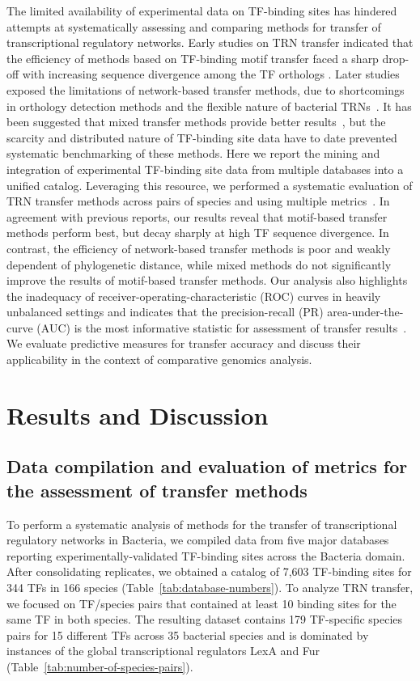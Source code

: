 The limited availability of experimental data on TF-binding sites has hindered
attempts at systematically assessing and comparing methods for transfer of
transcriptional regulatory networks. Early studies on TRN transfer indicated
that the efficiency of methods based on TF-binding motif transfer faced a sharp
drop-off with increasing sequence divergence among the TF orthologs
\citep{yu2004annotation}. Later studies exposed the limitations of
network-based transfer methods, due to shortcomings in orthology detection
methods and the flexible nature of bacterial TRNs~\citep{babu2006evolutionary,
  chavez2006bacterial, price2007orthologous}. It has been suggested that mixed
transfer methods provide better results~\citep{baumbach2010power}, but the
scarcity and distributed nature of TF-binding site data have to date prevented
systematic benchmarking of these methods. Here we report the mining and
integration of experimental TF-binding site data from multiple databases into a
unified catalog. Leveraging this resource, we performed a systematic evaluation
of TRN transfer methods across pairs of species and using multiple
metrics~\citep{kilic2015assessment}. In agreement with previous reports, our
results reveal that motif-based transfer methods perform best, but decay
sharply at high TF sequence divergence. In contrast, the efficiency of
network-based transfer methods is poor and weakly dependent of phylogenetic
distance, while mixed methods do not significantly improve the results of
motif-based transfer methods. Our analysis also highlights the inadequacy of
receiver-operating-characteristic (ROC) curves in heavily unbalanced settings
and indicates that the precision-recall (PR) area-under-the-curve (AUC) is the
most informative statistic for assessment of transfer
results~\citep{lewis1991evaluating, zweig1993receiver}. We evaluate
predictive measures for transfer accuracy and discuss their applicability in
the context of comparative genomics analysis.


\section{Results and Discussion}

\subsection{Data compilation and evaluation of metrics for the assessment of
  transfer methods}

To perform a systematic analysis of methods for the transfer of transcriptional
regulatory networks in Bacteria, we compiled data from five major databases
reporting experimentally-validated TF-binding sites across the Bacteria
domain. After consolidating replicates, we obtained a catalog of 7,603
TF-binding sites for 344 TFs in 166 species
(Table~\ref{tab:database-numbers}). To analyze TRN transfer, we focused on
TF/species pairs that contained at least 10 binding sites for the same TF in
both species. The resulting dataset contains 179 TF-specific species pairs for
15 different TFs across 35 bacterial species and is dominated by instances of
the global transcriptional regulators LexA and Fur
(Table~\ref{tab:number-of-species-pairs}).


